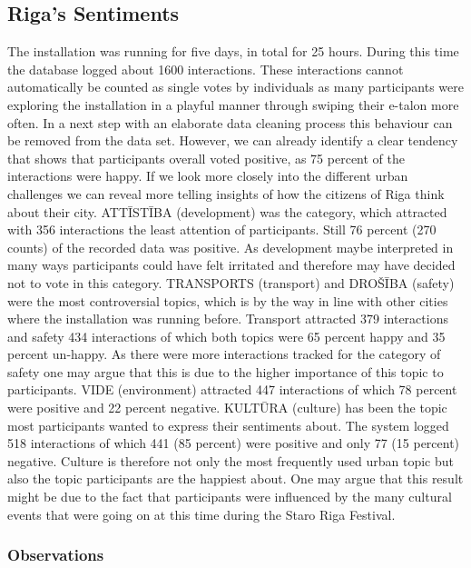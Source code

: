 \subsection{Riga’s Sentiments}

The installation was running for five days, in total for 25 hours. During this time the database logged about 1600 interactions. These interactions cannot automatically be counted as single votes by individuals as many participants were exploring the installation in a playful manner through swiping their e-talon more often. In a next step with an elaborate data cleaning process this behaviour can be removed from the data set. However, we can already identify a clear tendency that shows that participants overall voted positive, as 75 percent of the interactions were happy. If we look more closely into the different urban challenges we can reveal more telling insights of how the citizens of Riga think about their city. ATTĪSTĪBA (development) was the category, which attracted with 356 interactions the least attention of participants. Still 76 percent (270 counts) of the recorded data was positive. As development maybe interpreted in many ways participants could have felt irritated and therefore may have decided not to vote in this category. TRANSPORTS (transport) and DROŠĪBA (safety) were the most controversial topics, which is by the way in line with other cities where the installation was running before. Transport attracted 379 interactions and safety 434 interactions of which both topics were 65 percent happy and 35 percent un-happy. As there were more interactions tracked for the category of safety one may argue that this is due to the higher importance of this topic to participants. VIDE (environment) attracted 447 interactions of which 78 percent were positive and 22 percent negative. KULTŪRA (culture) has been the topic most participants wanted to express their sentiments about. The system logged 518 interactions of which 441 (85 percent) were positive and only 77 (15 percent) negative. Culture is therefore not only the most frequently used urban topic but also the topic participants are the happiest about. One may argue that this result might be due to the fact that participants were influenced by the many cultural events that were going on at this time during the Staro Riga Festival.

\subsubsection{Observations}

